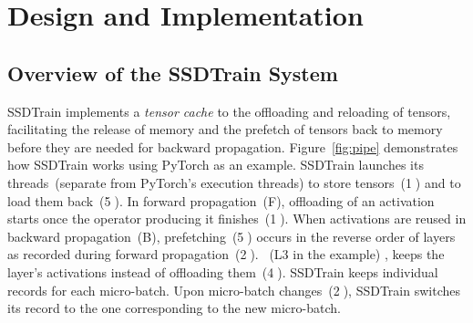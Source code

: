 


\section{Design and Implementation}

\subsection{Overview of the SSDTrain System}\label{sec:ssdtrain_overview}
SSDTrain implements a {\it tensor cache} to  the offloading and reloading of tensors, facilitating the release of memory and the prefetch of tensors back to memory before they are needed for backward propagation. 
Figure~\ref{fig:pipe} demonstrates how SSDTrain works using PyTorch as an example.
SSDTrain launches its threads~(separate from PyTorch's execution threads) to store tensors~(\textcircled{1}) and to load them back~(\textcircled{5}). In forward propagation~(F), offloading of an activation starts once the operator producing it finishes~(\textcircled{1}). When activations are reused in backward propagation~(B), prefetching~(\textcircled{5}) occurs in the reverse order of layers as recorded during forward propagation~(\textcircled{2}). ~(L3  in the example) ,  keeps the layer's activations  instead of offloading them~(\textcircled{4}). SSDTrain keeps individual records for each micro-batch. Upon micro-batch changes~(\textcircled{2}), SSDTrain switches its record to the one corresponding to the new micro-batch. 


